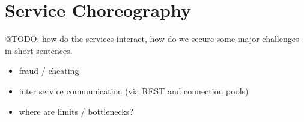 \section{Service Choreography}
\label{sec:Choreography}
@TODO: how do the services interact, how do we secure some major challenges in short sentences.
\begin{itemize}
\item fraud / cheating
\item inter service communication (via REST and connection pools)
\item where are limits / bottlenecks?
\end{itemize} 
